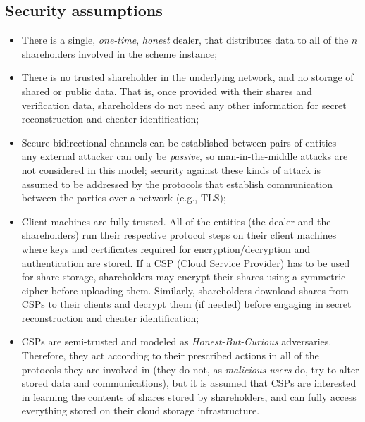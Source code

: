 \documentclass[10pt,journal,cspaper,compsoc]{IEEEtran}
\begin{document}
\subsection{Security assumptions}

\begin{itemize}
\item There is a single, \emph{one-time}, \emph{honest} dealer, that distributes data to all of the $n$ shareholders involved in the scheme instance;
\item There is no trusted shareholder in the underlying network, and no storage of shared or public data. That is, once provided with their shares and verification data, shareholders do not need any other information for secret reconstruction and cheater identification;
\item Secure bidirectional channels can be established between pairs of entities - any external attacker can only be \emph{passive}, so man-in-the-middle attacks are not considered in this model; security against these kinds of attack is assumed to be addressed by the protocols that establish communication between the parties over a network (e.g., TLS);
\item Client machines are fully trusted. All of the entities (the dealer and the shareholders) run their respective protocol steps on their client machines where keys and certificates required for encryption/decryption and authentication are stored. If a CSP (Cloud Service Provider) has to be used for share storage, shareholders may encrypt their shares using a symmetric cipher before uploading them. Similarly, shareholders download shares from CSPs to their clients and decrypt them (if needed) before engaging in secret reconstruction and cheater identification; 
\item CSPs are semi-trusted and modeled as \emph{Honest-But-Curious} adversaries. Therefore, they act according to their prescribed actions in all of the protocols they are involved in (they do not, as \emph{malicious users} do, try to alter stored data and communications), but it is assumed that CSPs are interested in learning the contents of shares stored by shareholders, and can fully access everything stored on their cloud storage infrastructure. \end{itemize}
\end{document}
